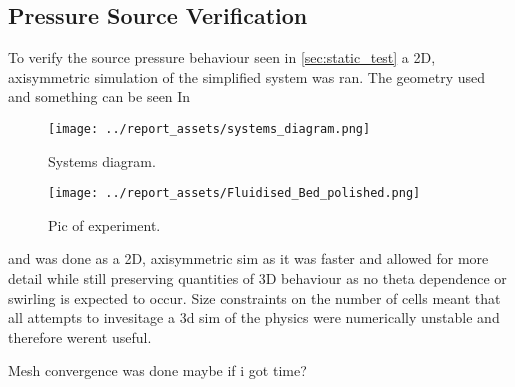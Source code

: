 \subsection{Pressure Source Verification}
To verify the source pressure behaviour seen in \autoref{sec:static_test} a 2D, axisymmetric simulation of the simplified system was ran. The geometry used and something can be seen In
\begin{figure}[htbp]
    \centering

    \begin{minipage}{0.95\textwidth}
        \centering
        \texttt{[image: ../report\_assets/systems\_diagram.png]}
        \caption{Systems diagram.}\label{fig:geometry_static_sim}
    \end{minipage}
    \hfill
    \begin{minipage}{0.45\textwidth}
        \centering
        \texttt{[image: ../report\_assets/Fluidised\_Bed\_polished.png]}
        \caption{Pic of experiment.}\label{fig:something_else}
    \end{minipage}

\end{figure}
and was done as a 2D, axisymmetric sim as it was faster and allowed for more detail while still preserving quantities of 3D behaviour as no theta dependence or swirling is expected to occur. Size constraints on the number of cells meant that all attempts to invesitage a 3d sim of the physics were numerically unstable and therefore werent useful.

Mesh convergence was done maybe if i got time?

